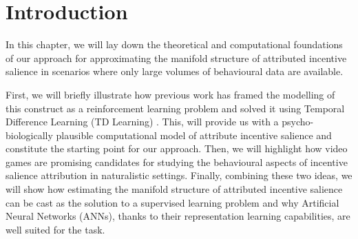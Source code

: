 \section{Introduction}
In this chapter, we will lay down the theoretical and computational foundations of our approach for approximating the manifold structure of attributed incentive salience in scenarios where only large volumes of behavioural data are available. 

First, we will briefly illustrate how previous work has framed the modelling of this construct as a reinforcement learning problem and solved it using Temporal Difference Learning (TD Learning) \cite{sutton1988learning}. This, will provide us with a psycho-biologically plausible computational model of attribute incentive salience and constitute the starting point for our approach. Then, we will highlight how video games are promising candidates for studying the behavioural aspects of incentive salience attribution in naturalistic settings. Finally, combining these two ideas, we will show how estimating the manifold structure of attributed incentive salience can be cast as the solution to a supervised learning problem and why Artificial Neural Networks (ANNs), thanks to their representation learning capabilities, are well suited for the task.

